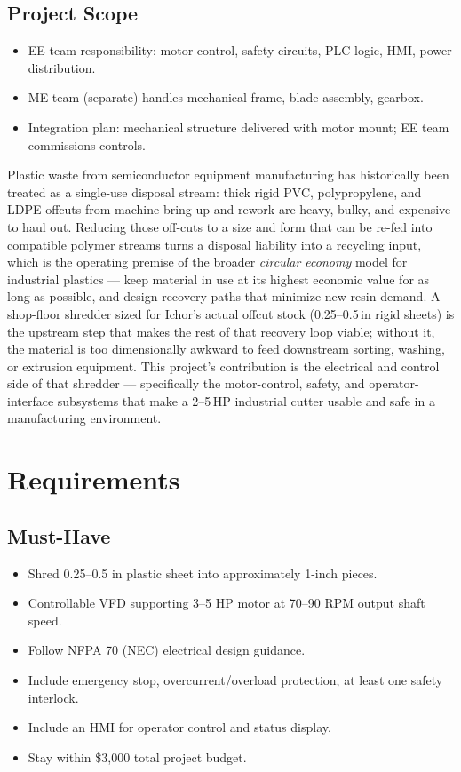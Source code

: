 \documentclass[hidelinks,12pt]{article}
\begin{document}
\subsection{Project Scope}
\begin{itemize}
    \item EE team responsibility: motor control, safety circuits, PLC logic, HMI, power distribution.
    \item ME team (separate) handles mechanical frame, blade assembly, gearbox.
    \item Integration plan: mechanical structure delivered with motor mount; EE team commissions controls.
\end{itemize}

Plastic waste from semiconductor equipment manufacturing has historically been treated as a single-use disposal stream: thick rigid PVC, polypropylene, and LDPE offcuts from machine bring-up and rework are heavy, bulky, and expensive to haul out. Reducing those off-cuts to a size and form that can be re-fed into compatible polymer streams turns a disposal liability into a recycling input, which is the operating premise of the broader \emph{circular economy} model for industrial plastics --- keep material in use at its highest economic value for as long as possible, and design recovery paths that minimize new resin demand. A shop-floor shredder sized for Ichor's actual offcut stock (0.25--0.5\,in rigid sheets) is the upstream step that makes the rest of that recovery loop viable; without it, the material is too dimensionally awkward to feed downstream sorting, washing, or extrusion equipment. This project's contribution is the electrical and control side of that shredder --- specifically the motor-control, safety, and operator-interface subsystems that make a 2--5\,HP industrial cutter usable and safe in a manufacturing environment.

\section{Requirements}

\subsection{Must-Have}
\begin{itemize}
    \item Shred 0.25--0.5 in plastic sheet into approximately 1-inch pieces.
    \item Controllable VFD supporting 3--5 HP motor at 70--90 RPM output shaft speed.
    \item Follow NFPA 70 (NEC) electrical design guidance.
    \item Include emergency stop, overcurrent/overload protection, at least one safety interlock.
    \item Include an HMI for operator control and status display.
    \item Stay within \$3,000 total project budget.
\end{itemize}
\end{document}
